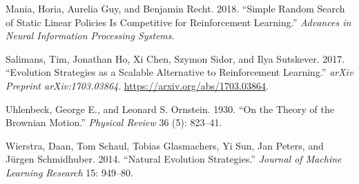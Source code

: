 \documentclass[
]{article}
\newlength{\cslhangindent}
\newenvironment{CSLReferences}[2] %
 {\begin{list}{}{%
  \setlength{\itemindent}{0pt}
  \setlength{\leftmargin}{0pt}
  \setlength{\parsep}{0pt}
  \ifodd #1
   \setlength{\leftmargin}{\cslhangindent}
   \setlength{\itemindent}{-1\cslhangindent}
  \fi
  \setlength{\itemsep}{#2\baselineskip}}}
 {\end{list}}
\begin{document}
\begin{CSLReferences}{1}{1}
Mania, Horia, Aurelia Guy, and Benjamin Recht. 2018. {``Simple Random
Search of Static Linear Policies Is Competitive for Reinforcement
Learning.''} \emph{Advances in Neural Information Processing Systems}.

Salimans, Tim, Jonathan Ho, Xi Chen, Szymon Sidor, and Ilya Sutskever.
2017. {``Evolution Strategies as a Scalable Alternative to Reinforcement
Learning.''} \emph{arXiv Preprint arXiv:1703.03864}.
\url{https://arxiv.org/abs/1703.03864}.

Uhlenbeck, George E., and Leonard S. Ornstein. 1930. {``On the Theory of
the Brownian Motion.''} \emph{Physical Review} 36 (5): 823--41.

Wierstra, Daan, Tom Schaul, Tobias Glasmachers, Yi Sun, Jan Peters, and
Jürgen Schmidhuber. 2014. {``Natural Evolution Strategies.''}
\emph{Journal of Machine Learning Research} 15: 949--80.

\end{CSLReferences}
\end{document}

